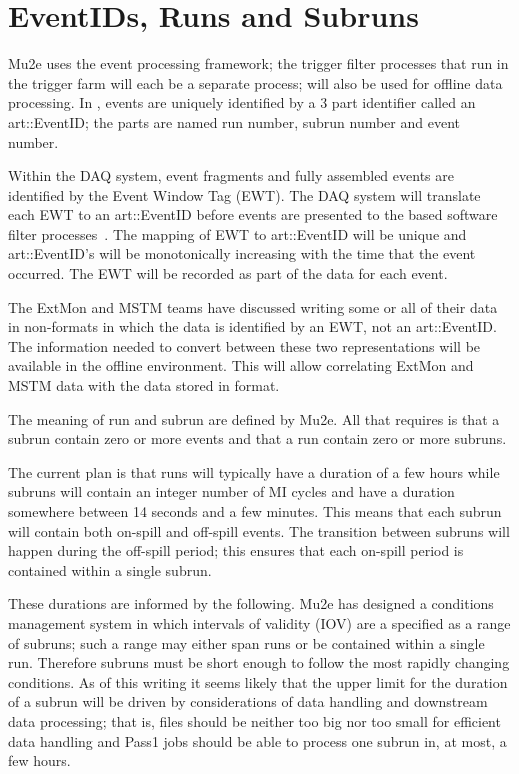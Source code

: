 \section{EventIDs, Runs and Subruns}
\label{sec:TagsIDsRunsSubRuns}


Mu2e uses the \art event processing framework;
the trigger filter processes that run in the trigger farm will each be a separate \art process;
\art will also be used for offline data processing.
In \art, events are uniquely identified by a 3 part identifier called an
{\code art::EventID}; the parts are named run number, subrun number
and event number.

Within the DAQ system, event fragments and fully assembled events
are identified by the Event Window Tag (EWT).
The DAQ system will translate each EWT to an {\code art::EventID}
before events are presented to the \art based software filter processes~\cite{EventLabels}.
The mapping of EWT to  {\code art::EventID} will be unique and
{\code art::EventID}'s will be monotonically increasing with the time
that the event occurred.
The EWT will be recorded as part of the \art data for each event.

The ExtMon and MSTM teams have discussed writing some or all of their data in non-\art formats
in which the data is identified by an EWT, not an {\code art::EventID}.
The information needed to convert between these two representations
will be available in the offline environment.
This will allow correlating ExtMon and MSTM data with the data stored in \art format.

The meaning of run and subrun are defined by Mu2e.
All that \art requires is that a subrun contain zero or more
events and that a run contain zero or more subruns.

The current plan is that runs will typically have a duration of a few hours
while subruns will contain an integer number of MI cycles and
have a duration somewhere between 14 seconds and a few minutes.
This means that each subrun will contain both on-spill and
off-spill events.
The transition between subruns will happen during the off-spill period;
this ensures that each on-spill period is contained within a single subrun.

These durations are informed by the following.
Mu2e has designed a conditions management system
in which intervals of validity (IOV) are a specified as a range of subruns;
such a range may either span runs or be contained within a single run.
Therefore subruns must be short enough to follow the most
rapidly changing conditions.  As of this writing it seems
likely that the upper limit for the duration of a subrun will
be driven by considerations of data handling and downstream data processing;
that is, files should be neither too big nor too small for efficient data handling
and Pass1 jobs should be able to process one subrun in, at most, a few hours.

